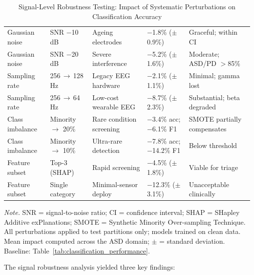 \begin{table}[!htbp]
\tablestripes\tablefontsize
\caption[Signal-Level Robustness Testing]{Signal-Level Robustness Testing: Impact of Systematic Perturbations on Classification Accuracy}
\tablefontsize
\begin{tabularx}{\textwidth}{@{} >{\raggedright\arraybackslash}p{2.2cm} L L >{\raggedright\arraybackslash}p{2cm} >{\raggedright\arraybackslash}p{2.5cm} @{}}
\toprule
{} &  &  &  &  \\
\midrule
Gaussian noise & SNR $-$10\,dB & Ageing electrodes & $-$1.8\% ($\pm$0.9\%) & Graceful; within CI \\
\addlinespace
Gaussian noise & SNR $-$20\,dB & Severe interference & $-$5.2\% ($\pm$1.6\%) & Moderate; ASD/PD $>$85\% \\
\addlinespace
Sampling rate & 256\,$\to$\,128\,Hz & Legacy EEG hardware & $-$2.1\% ($\pm$1.1\%) & Minimal; gamma lost \\
\addlinespace
Sampling rate & 256\,$\to$\,64\,Hz & Low-cost wearable EEG & $-$8.7\% ($\pm$2.3\%) & Substantial; beta degraded \\
\addlinespace
Class imbalance & Minority $\to$ 20\% & Rare condition screening & $-$3.4\% acc; $-$6.1\% F1 & SMOTE partially compensates \\
\addlinespace
Class imbalance & Minority $\to$ 10\% & Ultra-rare detection & $-$7.8\% acc; $-$14.2\% F1 & Below threshold \\
\addlinespace
Feature subset & Top-3 (SHAP) & Rapid screening & $-$4.5\% ($\pm$1.8\%) & Viable for triage \\
\addlinespace
Feature subset & Single category & Minimal-sensor deploy & $-$12.3\% ($\pm$3.1\%) & Unacceptable clinically \\
\bottomrule
\end{tabularx}
\vspace{0.5em}\noindent\textit{Note.} SNR = signal-to-noise ratio; CI = confidence interval; SHAP = SHapley Additive exPlanations; SMOTE = Synthetic Minority Over-sampling Technique. All perturbations applied to test partitions only; models trained on clean data. Mean impact computed across the ASD domain; $\pm$ = standard deviation. Baseline: Table~\ref{tab:classification_performance}.
\end{table}

The signal robustness analysis yielded three key findings:

